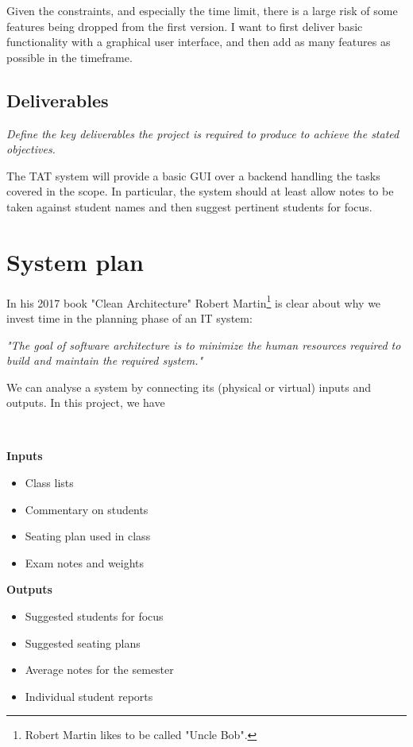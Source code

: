\documentclass[10pt]{article}
\begin{document}
Given the constraints, and especially the time limit, there is a large risk of some features being dropped from the first version. I want to first deliver basic functionality with a graphical user interface, and then add as many features as possible in the timeframe.

\subsection{Deliverables} 
\emph{Define the key deliverables the project is required to produce to achieve the stated objectives.}

The TAT system will provide a basic GUI over a backend handling the tasks covered in the scope. In particular, the system should at least allow notes to be taken against student names and then suggest pertinent students for focus.

\section{System plan} \label{inout}

In his 2017 book "Clean Architecture" Robert Martin\footnote{Robert Martin likes to be called "Uncle Bob".} is clear about why we invest time in the planning phase of an IT system:
\begin{center}
\emph{"The goal of software architecture is to minimize the human resources required to build and maintain the required system."} \cite[p. 5]{Mart17}
\end{center}


We can analyse a system by connecting its (physical or virtual) inputs and outputs. In this project, we have

\

\begin{minipage}[t]{0.38\textwidth}

\textbf{Inputs}

\begin{itemize}
\item Class lists
\item Commentary on students
\item Seating plan used in class
\item Exam notes and weights
\end{itemize}


\end{minipage}
\hfill
\vline
\hfill
\begin{minipage}[t]{0.48\textwidth}

\textbf{Outputs}

\begin{itemize}
\item Suggested students for focus
\item Suggested seating plans
\item Average notes for the semester
\item Individual student reports
\end{itemize}

\end{minipage}
\end{document}

